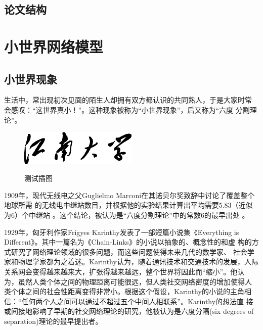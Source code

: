 \documentclass[phd]{jnuthesis}
\begin{document}
\section{论文结构}
\Blindtext

\chapter{小世界网络模型}\label{chapter_smallworld}
\section{小世界现象}

生活中，常出现初次见面的陌生人却拥有双方都认识的共同熟人，于是大家时常
会感叹：“这世界真小！”。这种现象被称为``小世界现象''，后又称为``六度
分割理论''。

\begin{figure}[htbp]
  \centering
  \includegraphics[width= 0.5\textwidth]{jnuname.eps}\\
  \caption{测试插图}\label{fig:test2}
\end{figure}

1909年，现代无线电之父Guglielmo Marconi在其诺贝尔奖致辞中讨论了覆盖整个地球所需
的无线电中继站数目，并根据他的实验结果计算出平均需要$5.83$（近似为$6$）个中继站
\cite{marconi1909nobel}。这个结论，被认为是``六度分割理论''中的常数$6$的最早出处
\cite{barabasi2003linked}。

1929年，匈牙利作家Frigyes Karinthy发表了一部短篇小说集《Everything is
  Different》。其中一篇名为《Chain-Links》的小说以抽象的、概念性的和虚
构的方式研究了网络理论领域的很多问题，而这些问题使得未来几代的数学家、
社会学家和物理学家都为之着迷\cite{newman2006structure,
  barabasi2003linked}。Karinthy认为，随着通讯技术和交通技术的发展，人际
关系网会变得越来越来大，扩张得越来越远，整个世界将因此而``缩小''。他认
为，虽然人类个体之间的物理距离可能很远，但人类社交网络密度的增加使得人
类个体之间的社会性距离变得非常小。根据这个假设，Karinthy的小说的主角相
信：``任何两个人之间可以通过不超过五个中间人相联系''。Karinthy的想法直
接或间接地影响了早期的社交网络理论的研究，他被认为是六度分隔(six
degrees of separation)理论的最早提出者\cite{barabasi2003linked}。
\end{document}
